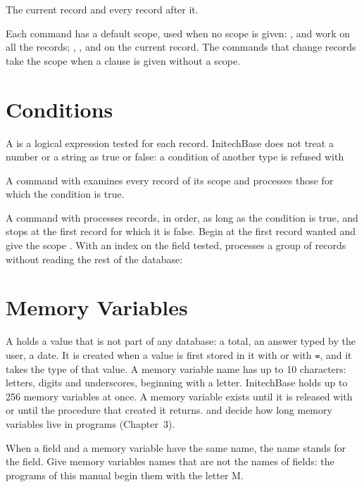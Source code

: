 The current record and every record after it.

Each command has a default scope, used when no scope is given: ,
 and  work on all the records; ,
,  and  on the current record.  The
commands that change records take the scope  when a  clause is
given without a scope.

\section{Conditions}
A  is a logical expression tested for each record.  InitechBase
does not treat a number or a string as true or false: a condition of another
type is refused with 

A command with   examines every record of
its scope and processes those for which the condition is true.

A command with   processes records, in
order, as long as the condition is true, and stops at the first record for
which it is false.  Begin at the first record wanted and give the scope
.  With an index on the field tested,  processes a group
of records without reading the rest of the database:

\section{Memory Variables}
A  holds a value that is not part of any database: a
total, an answer typed by the user, a date.  It is created when a value is
first stored in it with  or with \texttt{=}, and it takes the type
of that value.  A memory variable name has up to 10 characters: letters,
digits and underscores, beginning with a letter.  InitechBase holds up to 256
memory variables at once.
A memory variable exists until it is released with  or until the
procedure that created it returns.   and  decide how
long memory variables live in programs (Chapter~3).

When a field and a memory variable have the same name, the name stands for the
field.  Give memory variables names that are not the names of fields: the
programs of this manual begin them with the letter M.

